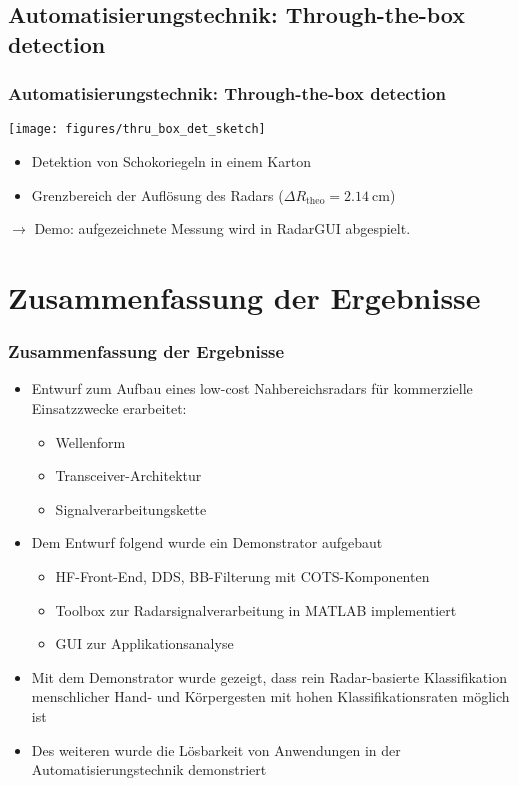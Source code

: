 \documentclass[16pt]{beamer}
\begin{document}
\subsection{Automatisierungstechnik: Through-the-box detection}
\begin{frame}
	\frametitle{Automatisierungstechnik: Through-the-box detection}
	\begin{center}
		\texttt{[image: figures/thru\_box\_det\_sketch]}
	\end{center}
	\begin{itemize}
		\item Detektion von Schokoriegeln in einem Karton
		\item Grenzbereich der Auflösung des Radars ($\Delta R_{\mathrm{theo}} = \SI{2,14}{\centi\meter}$)
	\end{itemize}
	$\rightarrow$ Demo: aufgezeichnete Messung wird in RadarGUI abgespielt.
\end{frame}

\section{Zusammenfassung der Ergebnisse}
\begin{frame}
\frametitle{Zusammenfassung der Ergebnisse}
\begin{itemize}
	\item Entwurf zum Aufbau eines low-cost Nahbereichsradars für kommerzielle Einsatzzwecke erarbeitet: 
		\begin{itemize}
			\item Wellenform 
			\item Transceiver-Architektur 
			\item Signalverarbeitungskette
		\end{itemize} 
	\item Dem Entwurf folgend wurde ein Demonstrator aufgebaut 
		\begin{itemize}
			\item HF-Front-End, DDS, BB-Filterung mit COTS-Komponenten 
			\item Toolbox zur Radarsignalverarbeitung in MATLAB implementiert
			\item GUI zur Applikationsanalyse %
		\end{itemize}
	\item Mit dem Demonstrator wurde gezeigt, dass rein Radar-basierte Klassifikation menschlicher Hand- und Körpergesten mit hohen Klassifikationsraten möglich ist
	\item Des weiteren wurde die Lösbarkeit von Anwendungen in der Automatisierungstechnik demonstriert
\end{itemize}
\end{frame}
\end{document}

